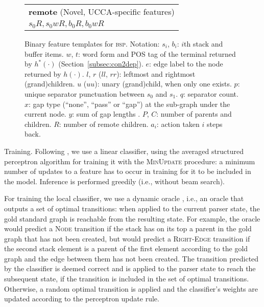 \documentclass[11pt,letterpaper]{article}
\makeatletter
\newcommand{\secref}[1]{Section~\ref{#1}}
\renewcommand{\paragraph}{
  \@startsection{paragraph}{4}
  {\z@}{.3ex \@plus .3ex \@minus .2ex}{-1em}
  {\normalfont\normalsize\bfseries}
}
\makeatother
\begin{document}
\begin{figure}
\begin{adjustbox}{margin=3pt,frame}
\begin{tabular}{>{\small}l}
\textbf{remote} \footnotesize (Novel, UCCA-specific features) \\
$s_0R, s_0wR, b_0R, b_0wR$
\end{tabular}
\end{adjustbox}
\caption{\label{fig:features}
  Binary feature templates for \textsc{bsp}. Notation:
  $s_i$, $b_i$: $i$th stack and buffer items.
  $w$, $t$: word form and POS tag of the terminal returned by $h^*(\cdot)$
  (\secref{subsec:con2dep}).
  $e$: edge label to the node returned by $h(\cdot)$.
  $l$, $r$ ($ll$, $rr$): leftmost and rightmost (grand)children.
  $u$ ($uu$): unary (grand)child, when only one exists.
  $p$: unique separator punctuation between $s_0$ and $s_1$. $q$: separator count.
  $x$: gap type (``none'', ``pass'' or ``gap'') at the sub-graph under the current node.
  $y$: sum of gap lengths \protect\cite{Maier:Lichte:11}.
  $P$, $C$: number of parents and children.
  $R$: number of remote children.
  $a_i$: action taken $i$ steps back.
}
\end{figure}

\paragraph{Training.}
Following , we use a linear classifier, using
the averaged structured perceptron algorithm for training it
\cite{Coll:04} with the \textsc{MinUpdate} \cite{goldberg2011learning} procedure:
a minimum number of updates to a feature has to occur in training for it
to be included in the model. Inference is performed greedily (i.e., without beam search).

For training the local classifier, we use a dynamic oracle \cite{goldberg2012dynamic},
i.e., an oracle that outputs a set of optimal transitions: when
applied to the current parser state, the gold
standard graph is reachable from the resulting state.
For example, the oracle would predict a \textsc{Node} transition if the stack 
has on its top a parent in the gold graph that has not been created,
but would predict a \textsc{Right-Edge} transition if the second stack
element is a parent of the
first element according to the gold graph and the edge between them has not been created.
The transition predicted by the classifier is deemed correct
and is applied to the parser state to reach the subsequent state,
if the transition is included in the set of optimal transitions.
Otherwise, a random optimal transition is applied
and the classifier's weights are updated according to the perceptron
update rule.
\end{document}
